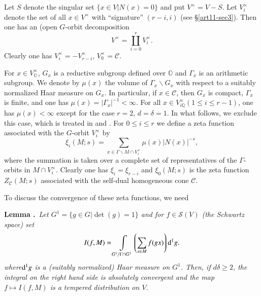 Let $S$ denote the singular set $\{x\in V|N(x)=0\}$ and put $V^{\times}=V-S$. Let $V^{\times}_{i}$ denote the set of all $x\in V^{\times}$ with ``signature'' $(r-i,i)$ (see \S\ref{art11-sec3}). Then one has an (open $G$-orbit decomposition
\begin{equation}
V^{\times}=\coprod\limits^{r}_{i=0}V^{\times}_{i}.\label{art11-eq4}
\end{equation}
Clearly one has $V^{\times}_{i}=-V^{\times}_{r-i}$, $V^{\times}_{0}=\mathscr{C}$.

For $x\in V^{\times}_{\mathbb{O}}$, $G_{x}$ is a reductive subgroup defined over $\mathbb{O}$ and $\Gamma_{x}$ is an arithmetic subgroup. We denote by $\mu(x)$ the volume of $\Gamma_{x}\backslash G_{x}$ with respect to a suitably normalized Haar measure on $G_{x}$. In particular, if $x\in \mathscr{C}$, then $G_{x}$ is compact, $\Gamma_{x}$ is finite, and one has $\mu(x)=|\Gamma_{x}|^{-1}<\infty$. For all $x\in V^{\times}_{i\mathbb{Q}}(1\leq i\leq r-1)$, one has $\mu(x)<\infty$ except for the case $r=2$, $d=\delta=1$. In what follows, we exclude this case, which is treated in \cite{art11-keySi} and \cite{art11-keySh}. For $0\leq i\leq r$ we define a zeta function associated with the $G$-orbit $V^{\times}_{i}$ by
\begin{equation}
\xi_{i}(M;s)=\sum\limits_{x\in \Gamma\backslash M\cap V^{\times}_{i}}\mu(x)|N(x)|^{-s},\label{art11-eq5}
\end{equation}
where the summation is taken over a complete set of representatives of the $\Gamma$-orbits in $M\cap V^{\times}_{i}$. Clearly one has $\xi_{i}=\xi_{r-i}$ and $\xi_{0}(M;s)$ is the zeta function $Z_{\mathscr{C}}(M;s)$ associated with the self-dual homogeneous cone $\mathscr{C}$.

To discuss the convergence of these zeta functions, we need

\medskip
\noindent
{\bf Lemma .\label{art11-lem1}}~{\em Let $G^{1}=\{g\in G|\det(g)=1\}$ and for $f\in \mathscr{S}(V)$ (the Schwartz space) set}
$$
I(f,M)=\int\limits_{G^{1}/\Gamma\cap G^{1}}\left(\sum\limits_{x\in M}f(gx)\right)\mathrm{d}^{1}g.
$$
{\em where\pageoriginale $\mathrm{d}^{1}g$ is a (suitably normalized) Haar measure on $G^{1}$. Then, if $d\delta\geq 2$, the integral on the right hand side is absolutely convergent and the map $f\mapsto I(f,M)$ is a tempered distribution on $V$.}

